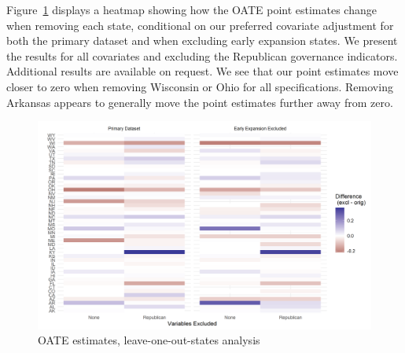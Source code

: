 \documentclass[12pt]{article}
\begin{document}
Figure~\ref{fig:oateheatmap} displays a heatmap showing how the OATE point estimates change when removing each state, conditional on our preferred covariate adjustment for both the primary dataset and when excluding early expansion states. We present the results for all covariates and excluding the Republican governance indicators. Additional results are available on request. We see that our point estimates move closer to zero when removing Wisconsin or Ohio for all specifications. Removing Arkansas appears to generally move the point estimates further away from zero.

\begin{figure}[]
\begin{center}
    \includegraphics[scale=0.6]{01_Plots/oate-loo-state-cov-group-heatmap-states.png}
    \caption{OATE estimates, leave-one-out-states analysis}
    \label{fig:oateheatmap}
\end{center}
\end{figure}
\end{document}
